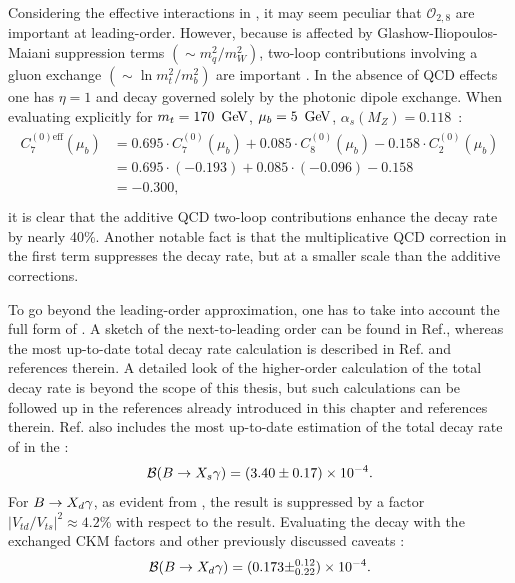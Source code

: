 Considering the effective interactions in , it may seem peculiar that $\mathcal{O}_{2,8}$ are important at leading-order.
However, because \BtoXsgamma is affected by Glashow-Iliopoulos-Maiani suppression terms $(\sim m_q^2/m_W^2)$, two-loop contributions involving a gluon exchange $(\sim\ln m_t^2/m_b^2)$ are important \cite{Bertolini:1986th}.
In the absence of QCD effects one has $\eta=1$ and \BtoXsgamma decay governed solely by the photonic dipole exchange.
When evaluating  explicitly for $m_t=170~\mathrm{\,Ge\kern -0.1em V}$, $\mu_b=5~\mathrm{\,Ge\kern -0.1em V}$, $\alpha_s(M_Z)=0.118$~\cite{Buras:1998raa}:
\begin{align}
    \begin{split}
        C_7^{(0)\mathrm{eff}}(\mu_b) &= 0.695 \cdot C_7^{(0)}(\mu_b) + 0.085 \cdot C_8^{(0)}(\mu_b) - 0.158 \cdot C_2^{(0)}(\mu_b)  \\ 
                          &= 0.695 \cdot (-0.193) + 0.085 \cdot (-0.096) - 0.158\\
                          &= -0.300, \\
    \end{split}
\end{align}
it is clear that the additive QCD two-loop contributions enhance the decay rate by nearly 40\%.
Another notable fact is that the multiplicative QCD correction in the first term suppresses the decay rate, but at a smaller scale than the additive corrections.

To go beyond the leading-order approximation, one has to take into account the full form of .
A sketch of the next-to-leading order can be found in Ref.\cite{Gambino:2001ew}, whereas the most up-to-date total decay rate calculation is described in Ref.\cite{Misiak:2020vlo} and references therein.
A detailed look of the higher-order calculation of the total \BtoXsgamma decay rate is beyond the scope of this thesis, but such calculations can be followed up in the references already introduced in this chapter and references therein. 
Ref.\cite{Misiak:2020vlo} also includes the most up-to-date estimation of the total decay rate of \BtoXsgamma in the \SM:
\begin{equation}\label{eq:btosgamma_theoretical}
    \mathcal{B}(\BtoXsgamma) = (3.40\pm 0.17) \times 10^{-4}.
\end{equation}
For $\BtoXdgamma$, as evident from , the result is suppressed by a factor $|V_{td}/V_{ts}|^2\approx 4.2\%$ with respect to the \BtoXsgamma result.
Evaluating the decay with the exchanged CKM factors and other previously discussed caveats \cite{Misiak:2015xwa}:
\begin{equation}\label{eq:btodgamma_theoretical}
    \mathcal{B}(\BtoXdgamma) = (0.173\pm^{0.12}_{0.22}) \times 10^{-4}.
\end{equation}

